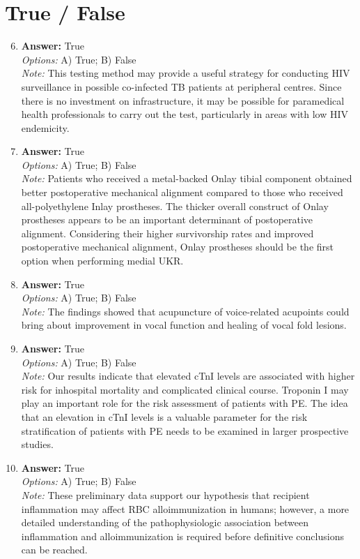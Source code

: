 \documentclass[12pt]{article}
\begin{document}
\section*{True / False}
\begin{enumerate}[label=\arabic*.]
\setcounter{enumi}{5}
\item \textbf{Answer:} True
\\ \textit{Options:} A) True; B) False
\\ \textit{Note:} This testing method may provide a useful strategy for conducting HIV surveillance in possible co-infected TB patients at peripheral centres. Since there is no investment on infrastructure, it may be possible for paramedical health professionals to carry out the test, particularly in areas with low HIV endemicity.
\item \textbf{Answer:} True
\\ \textit{Options:} A) True; B) False
\\ \textit{Note:} Patients who received a metal-backed Onlay tibial component obtained better postoperative mechanical alignment compared to those who received all-polyethylene Inlay prostheses. The thicker overall construct of Onlay prostheses appears to be an important determinant of postoperative alignment. Considering their higher survivorship rates and improved postoperative mechanical alignment, Onlay prostheses should be the first option when performing medial UKR.
\item \textbf{Answer:} True
\\ \textit{Options:} A) True; B) False
\\ \textit{Note:} The findings showed that acupuncture of voice-related acupoints could bring about improvement in vocal function and healing of vocal fold lesions.
\item \textbf{Answer:} True
\\ \textit{Options:} A) True; B) False
\\ \textit{Note:} Our results indicate that elevated cTnI levels are associated with higher risk for inhospital mortality and complicated clinical course. Troponin I may play an important role for the risk assessment of patients with PE. The idea that an elevation in cTnI levels is a valuable parameter for the risk stratification of patients with PE needs to be examined in larger prospective studies.
\item \textbf{Answer:} True
\\ \textit{Options:} A) True; B) False
\\ \textit{Note:} These preliminary data support our hypothesis that recipient inflammation may affect RBC alloimmunization in humans; however, a more detailed understanding of the pathophysiologic association between inflammation and alloimmunization is required before definitive conclusions can be reached.
\end{enumerate}
\end{document}
